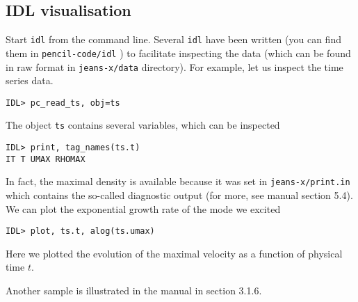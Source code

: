 \documentclass[a4paper,12pt]{article}
\begin{document}
\subsection{IDL visualisation}

Start \verb|idl| from the command line. Several \verb|idl| have been written (you can find them in
\verb|pencil-code/idl| ) to facilitate inspecting the data (which can be found
in raw format in \verb|jeans-x/data| directory).  For example, let us inspect
the time series data.
\begin{verbatim}
IDL> pc_read_ts, obj=ts
\end{verbatim}
The object \verb|ts| contains several variables, which can be inspected
\begin{verbatim}
IDL> print, tag_names(ts.t)
IT T UMAX RHOMAX
\end{verbatim}
In fact, the maximal density is available because it was set in
\verb|jeans-x/print.in| which contains the so-called diagnostic output
(for more, see manual section 5.4). 
We can plot the exponential growth rate of the mode we excited
\begin{verbatim}
IDL> plot, ts.t, alog(ts.umax)
\end{verbatim}
Here we plotted the evolution of the maximal velocity as a function of physical
time $t$.


Another sample is illustrated in the manual in section 3.1.6.
\end{document}
